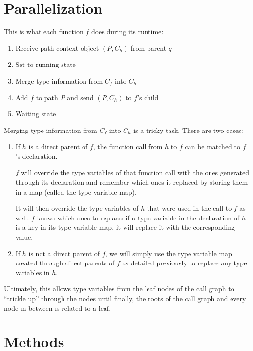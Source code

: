 \documentclass{acm_proc_article-sp}
\begin{document}

\section{Parallelization}

This is what each function $f$ does during its runtime:
\begin{enumerate}[noitemsep]
	\item Receive path-context object $(P, C_h)$ from parent $g$
	\item Set to running state
	\item Merge type information from $C_f$ into $C_h$
	\item Add $f$ to path $P$ and send $(P, C_h)$ to $f$'s child
	\item Waiting state
\end{enumerate}

Merging type information from $C_f$ into $C_h$ is a tricky task. There are two
cases:
\begin{enumerate}
	\item If $h$ is a direct parent of $f$, the function call from $h$ to $f$
		can be matched to $f$'s declaration.

		$f$ will override the type
		variables of that function call with the ones generated through its
		declaration and remember which ones it replaced by storing them in a
		map (called the type variable map).

		It will then override the type variables of $h$ that were used in the
		call to $f$ as well. $f$ knows which ones to replace: if a type
		variable in the declaration of $h$ is a key in its type variable map,
		it will replace it with the corresponding value.
	\item If $h$ is not a direct parent of $f$, we will simply use the type
		variable map created through direct parents of $f$ as detailed
		previously to replace any type variables in $h$.
\end{enumerate}

Ultimately, this allows type variables from the leaf nodes of the call graph to
``trickle up'' through the nodes until finally, the roots of the call graph and
every node in between is related to a leaf.




\section{Methods}
\end{document}
